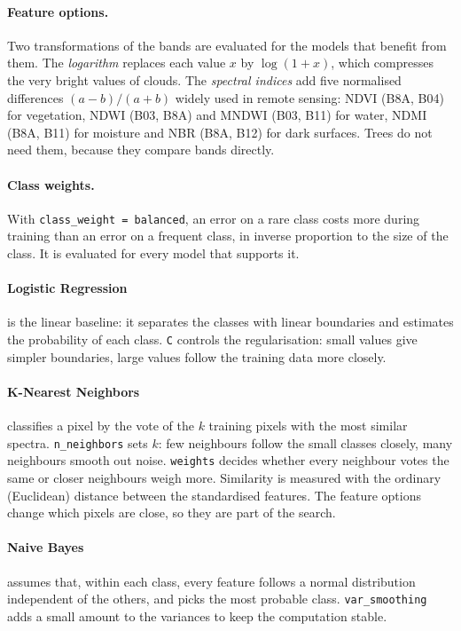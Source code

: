 \documentclass[11pt,a4paper]{article}
\begin{document}
\paragraph{Feature options.} Two transformations of the bands are evaluated
for the models that benefit from them. The \emph{logarithm} replaces each
value $x$ by $\log(1+x)$, which compresses the very bright values of clouds.
The \emph{spectral indices} add five normalised differences $(a-b)/(a+b)$
widely used in remote sensing: NDVI (B8A, B04) for vegetation, NDWI (B03,
B8A) and MNDWI (B03, B11) for water, NDMI (B8A, B11) for moisture and NBR
(B8A, B12) for dark surfaces. Trees do not need them, because they compare
bands directly.

\paragraph{Class weights.} With \texttt{class\_weight = balanced}, an error on
a rare class costs more during training than an error on a frequent class, in
inverse proportion to the size of the class. It is evaluated for every model
that supports it.

\paragraph{Logistic Regression} is the linear baseline: it separates the
classes with linear boundaries and estimates the probability of each class.
\texttt{C} controls the regularisation: small values give simpler boundaries,
large values follow the training data more closely.

\paragraph{K-Nearest Neighbors} classifies a pixel by the vote of the $k$
training pixels with the most similar spectra. \texttt{n\_neighbors} sets $k$:
few neighbours follow the small classes closely, many neighbours smooth out
noise. \texttt{weights} decides whether every neighbour votes the same or
closer neighbours weigh more. Similarity is measured with the ordinary
(Euclidean) distance between the standardised features. The feature options
change which pixels are close, so they are part of the search.

\paragraph{Naive Bayes} assumes that, within each class, every feature
follows a normal distribution independent of the others, and picks the most
probable class. \texttt{var\_smoothing} adds a small amount to the variances
to keep the computation stable.
\end{document}
